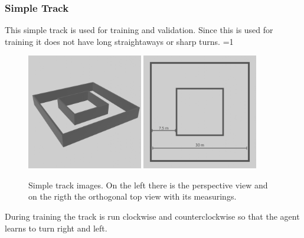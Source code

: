 \documentclass[14pt]{extarticle}
\newcounter{debug}
\begin{document}
\begin{flushleft}
	\subsubsection{Simple Track}
	This simple track is used for training and validation. Since this is used for training it does not have long straightaways or sharp turns.
	\ifnum\value{debug}=1 {
	\begin{figure}[H]
    		\centering\includegraphics[width=0.45\textwidth]{./Image/Environment/Easy/perspective.png}
    		\centering\includegraphics[width=0.45\textwidth]{./Image/Environment/Easy/top_mod.png}
		\vspace{5mm}
		\caption{Simple track images. On the left there is the perspective view and on the rigth the orthogonal top view with its measurings.}
	\end{figure}
	}\fi
	During training the track is run clockwise and counterclockwise so that the agent learns to turn right and left.
	

\end{flushleft}
\end{document}
